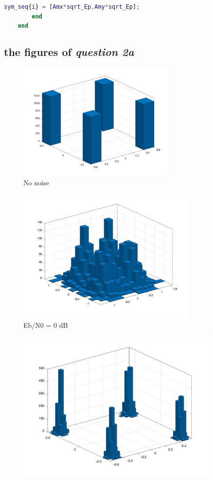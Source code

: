 \documentclass{article}
\begin{document}
\begin{CJK*}{UTF8}{bsmi}
\begin{lstlisting}[language = Matlab]
            sym_seq{i} = [Amx*sqrt_Ep,Amy*sqrt_Ep];
        end
    end
\end{lstlisting}
\pagebreak
\subsection{the figures of \emph{question 2a}}

\begin{figure}[!htb]
    \centering
    \includegraphics[width=0.7\textwidth]{2a_no.jpg}
    \caption{\label{fig:2a_no.jpg} No noise}
    \end{figure}
    \begin{figure}[!htb]
    \centering
    \includegraphics[width=0.8\textwidth]{2a_0.jpg}
    \caption{\label{fig:2a_0.jpg} Eb/N0 = 0 dB}
    \end{figure}
    \begin{figure}[!htb]
    \centering
    \includegraphics[width=0.9\textwidth]{2a_10.jpg}

\end{figure}
\end{CJK*}
\end{document}
